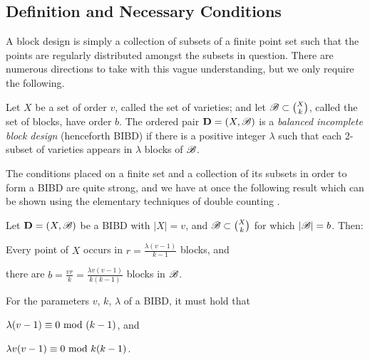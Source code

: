 \documentclass[../../../main]{subfiles}
\begin{document}
\subsection{Definition and Necessary Conditions}

A block design is simply a collection of subsets of a finite point set such
that the points are regularly distributed amongst the subsets in question.
There are numerous directions to take with this vague understanding, but we only
require the following.

 \begin{defin}\label{bibd}
 Let $X$ be a set of order $v$, called the set of varieties; and let $\mathscr{B} \subset \binom{X}{k}$, called the set of blocks, have order $b$. The ordered pair $\mathbf{D}=(X,\mathscr{B})$ is a {\it balanced incomplete block design} (henceforth BIBD) if there is a positive integer $\lambda$ such that each 2-subset of varieties appears in $\lambda$ blocks of $\mathscr{B}$. \\
 \end{defin}

 The conditions placed on a finite set and a collection of its subsets in order
 to form a BIBD are quite strong, and we have at once the following result which
 can be shown using the elementary techniques of double counting
 \cite[see][Chapter 2 for
 an abstract discussion]{cameron-combinatorics}.

 \begin{prop}\label{prop-bibd-params}
   Let $\mathbf{D}=(X,\mathscr{B})$ be a BIBD with $|X| = v$, and $\mathscr{B} \subset \binom{X}{k}$ for which $|\mathscr{B}| = b$. Then:
   \begin{defenum}
   \item\label{replications} Every point of $X$ occurs in $r = \frac{\lambda(v-1)}{k-1}$ blocks, and 
   \item\label{blocks} there are $b = \frac{vr}{k} = \frac{\lambda v(v-1)}{k(k-1)}$ blocks in $\mathscr{B}$.
   \end{defenum}
 \end{prop}

 \begin{cor}\label{cor-bibd-params}
   For the parameters $v$, $k$, $\lambda$ of a BIBD, it must hold that 
   \begin{defenum}
   \item $\lambda(v-1) \equiv 0 \text{ mod } (k-1)$, and
   \item $\lambda v(v-1) \equiv 0 \text{ mod } k(k-1)$.
   \end{defenum}
 \end{cor}
\end{document}
